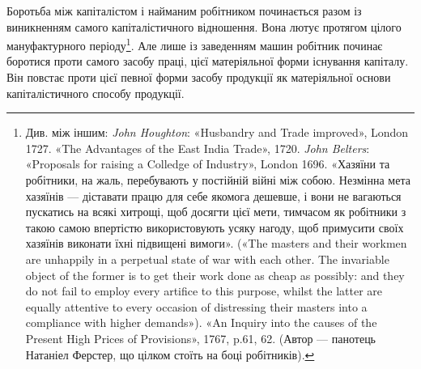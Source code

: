 Боротьба між капіталістом і найманим робітником починається
разом із виникненням самого капіталістичного відношення. Вона
лютує протягом цілого мануфактурного періоду\footnote{
Див. між іншим: \emph{John Houghton}: «Husbandry and Trade improved»,
London 1727. «The Advantages of the East India Trade», 1720.
\emph{John Belters}: «Proposals for raising a Colledge of Industry», London
1696. «Хазяїни та робітники, на жаль, перебувають у постійній війні
між собою. Незмінна мета хазяїнів — діставати працю для себе якомога
дешевше, і вони не вагаються пускатись на всякі хитрощі, щоб досягти
цієї мети, тимчасом як робітники з такою самою впертістю використовують
усяку нагоду, щоб примусити своїх хазяїнів виконати їхні підвищені
вимоги». («The masters and their workmen are unhappily in a perpetual
state of war with each other. The invariable object of the former is to
get their work done as cheap as possibly: and they do not fail to employ
every artifice to this purpose, whilst the latter are equally attentive to
every occasion of distressing their masters into a compliance with higher
demands»). «An Inquiry into the causes of the Present High Prices of
Provisions», 1767, p.61, 62. (Автор — панотець Натаніел Ферстер, що цілком
стоїть на боці робітників).
}. Але лише із заведенням машин робітник починає боротися проти самого
засобу праці, цієї матеріяльної форми існування капіталу. Він
повстає проти цієї певної форми засобу продукції як матеріяльної
основи капіталістичного способу продукції.

